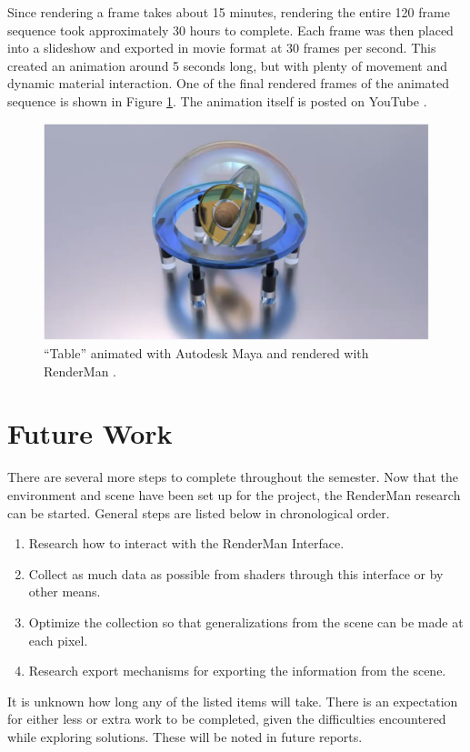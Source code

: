 \documentclass[conference]{IEEEtran}
\begin{document}
Since rendering a frame takes about 15 minutes,
rendering the entire 120 frame sequence took approximately 30 hours to complete.
Each frame was then placed into a slideshow and exported in movie format at 30 frames per second.
This created an animation around 5 seconds long,
but with plenty of movement and dynamic material interaction.
One of the final rendered frames of the animated sequence is shown in Figure \ref{fig:table}.
The animation itself is posted on YouTube \cite{animation}.

\begin{figure}[htbp]
\centerline{\includegraphics[width=18cm]{table.png}}
\caption{``Table'' animated with Autodesk Maya and rendered with RenderMan \cite{animation}.}
\label{fig:table}
\end{figure}

\section{Future Work}
\label{sec:future}
There are several more steps to complete throughout the semester.
Now that the environment and scene have been set up for the project,
the RenderMan research can be started.
General steps are listed below in chronological order.
\begin{enumerate}
\item Research how to interact with the RenderMan Interface.
\item Collect as much data as possible from shaders through this interface or by other means.
\item Optimize the collection so that generalizations from the scene can be made at each pixel.
\item Research export mechanisms for exporting the information from the scene.
\end{enumerate}
It is unknown how long any of the listed items will take.
There is an expectation for either less or extra work to be completed,
given the difficulties encountered while exploring solutions.
These will be noted in future reports.
\end{document}

